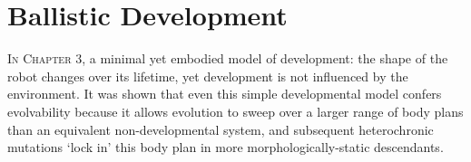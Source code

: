 




\section{Ballistic Development}


\textsc{In Chapter 3,}
a minimal yet embodied model of development: 
the shape of the
robot changes over its lifetime, yet development is not influenced
by the environment. 
It was shown that even this simple developmental
model confers evolvability because it allows evolution to sweep over a larger range of body plans than an equivalent non-developmental system, and subsequent heterochronic mutations
`lock in' this body plan in more morphologically-static descendants.


